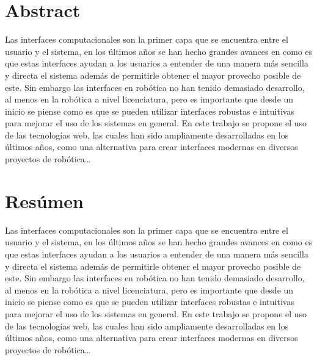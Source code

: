\begingroup
\let\clearpage\relax
\let\cleardoublepage\relax
\let\cleardoublepage\relax

\chapter*{Abstract}
Las interfaces computacionales son la primer capa que se encuentra entre el usuario y el sistema, en los últimos años se han hecho grandes avances en como es que estas interfaces ayudan a los usuarios a entender de una manera más sencilla y directa el sistema además de permitirle obtener el mayor provecho posible de este. Sin embargo las interfaces en robótica no han tenido demasiado desarrollo, al menos en la robótica a nivel licenciatura, pero es importante que desde un inicio se piense como es que se pueden utilizar interfaces robustas e intuitivas para mejorar el uso de los sistemas en general. En este trabajo se propone el uso de las tecnologías web, las cuales han sido ampliamente desarrolladas en los últimos años, como una alternativa para crear interfaces modernas en diversos proyectos de robótica\dots


\vfill

\chapter*{Resúmen}
Las interfaces computacionales son la primer capa que se encuentra entre el usuario y el sistema, en los últimos años se han hecho grandes avances en como es que estas interfaces ayudan a los usuarios a entender de una manera más sencilla y directa el sistema además de permitirle obtener el mayor provecho posible de este. Sin embargo las interfaces en robótica no han tenido demasiado desarrollo, al menos en la robótica a nivel licenciatura, pero es importante que desde un inicio se piense como es que se pueden utilizar interfaces robustas e intuitivas para mejorar el uso de los sistemas en general. En este trabajo se propone el uso de las tecnologías web, las cuales han sido ampliamente desarrolladas en los últimos años, como una alternativa para crear interfaces modernas en diversos proyectos de robótica\dots


\endgroup			

\vfill